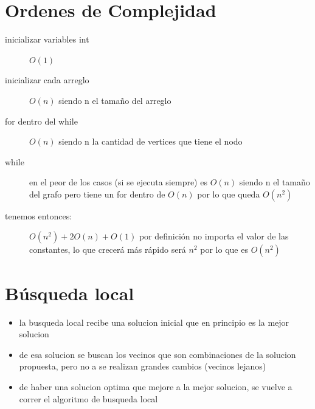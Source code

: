 \documentclass[a4paper,11pt]{article}
\begin{document}
\section*{Ordenes de Complejidad}
\begin{description}
  \item[inicializar variables int] $O(1)$
  \item[inicializar cada arreglo] $O (n)$ siendo n el tamaño del arreglo
  \item[for dentro del while] $O (n)$ siendo n la cantidad de vertices que tiene el nodo
  \item[while] en el peor de los casos (si se ejecuta siempre) es $O(n)$  siendo n el tamaño del grafo pero tiene un for dentro de $O(n)$ por lo que queda $O(n^{2})$
  \item[tenemos entonces:] $O(n^{2}) + 2 O (n) + O(1)$ por definición no importa el valor de las constantes, lo que crecerá más rápido será $n^{2}$ por lo que es $O(n^{2})$
\end{description}


\section{Búsqueda local}
\begin{itemize}
  \item la busqueda local recibe una solucion inicial que en principio es la mejor solucion
  \item de esa solucion se buscan los vecinos que son combinaciones de la solucion propuesta, pero no a se realizan grandes cambios (vecinos lejanos)
  \item de haber una solucion optima que mejore a la mejor solucion, se vuelve a correr el algoritmo de busqueda local
\end{itemize}
\end{document}
